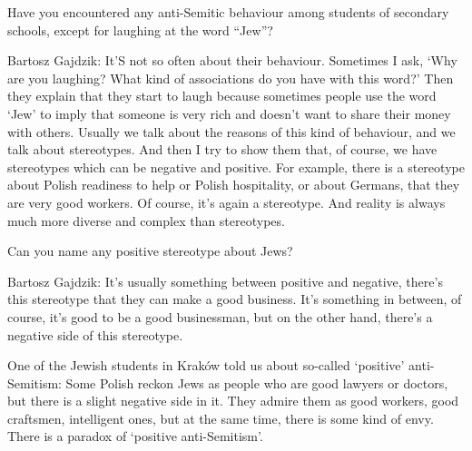 Have you encountered any anti-Semitic behaviour among students of secondary schools, except for laughing at the word “Jew”? 

Bartosz Gajdzik: It’S not so often about their behaviour. Sometimes I ask, ‘Why are you laughing? What kind of associations do you have with this word?’ Then they explain that they start to laugh because sometimes people use the word ‘Jew’ to imply that someone is very rich and doesn’t want to share their money with others. Usually we talk about the reasons of this kind of behaviour, and we talk about stereotypes. And then I try to show them that, of course, we have stereotypes which can be negative and positive. For example, there is a stereotype about Polish readiness to help or Polish hospitality, or about Germans, that they are very good workers. Of course, it’s again a stereotype. And reality is always much more diverse and complex than stereotypes. 

Can you name any positive stereotype about Jews? 

Bartosz Gajdzik: It’s usually something between positive and negative, there’s this stereotype that they can make a good business. It’s something in between, of course, it’s good to be a good businessman, but on the other hand, there’s a negative side of this stereotype. 

One of the Jewish students in Kraków told us about so-called ‘positive’ anti-Semitism: Some Polish reckon Jews as people who are good lawyers or doctors, but there is a slight negative side in it. They admire them as good workers, good craftsmen, intelligent ones, but at the same time, there is some kind of envy. There is a paradox of ‘positive anti-Semitism’. 


